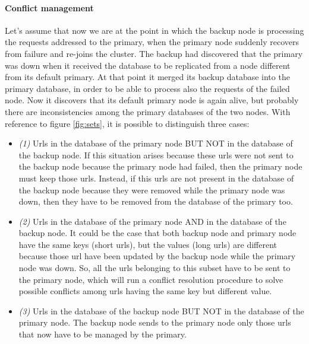 \documentclass{article}
\begin{document}
\paragraph{Conflict management} Let's assume that now we are at the point in which the backup node is processing the requests addressed to the  primary, when the primary node suddenly recovers from failure and re-joins the cluster. The backup had discovered that the primary was down when it received the database to be replicated from a node different from its default primary. At that point it merged its backup database into the primary database, in order to be able to process also the requests of the failed node. Now it discovers that its default primary node is again alive, but probably there are inconsistencies among the primary databases of the two nodes. With reference to figure \ref{fig:sets}, it is possible to distinguish three cases:
\begin{itemize}
\item \textit{(1)} Urls in the database of the primary node BUT NOT in the database of the backup node. If this situation arises because these urls were not sent to the backup node because the primary node had failed, then the primary node must keep those urls. Instead, if this urls are not present in the database of the backup node because they were removed while the primary node was down, then they have to be removed from the database of the primary too.
\item \textit{(2)} Urls in the database of the primary node AND in the database of the backup node. It could be the case that both backup node and primary node have the same keys (short urls), but the values (long urls) are different because those url have been updated by the backup node while the primary node was down. So, all the urls belonging to this subset have to be sent to the primary node, which will run a conflict resolution procedure to solve possible conflicts among urls having the same key but different value.
\item \textit{(3)} Urls in the database of the backup node BUT NOT in the database of the primary node. The backup node sends to the primary node only those urls that now have to be managed by the primary.
\end{itemize}
\end{document}
